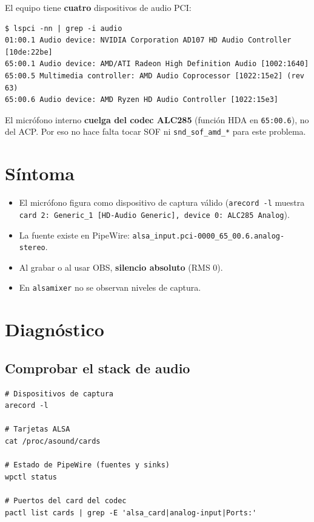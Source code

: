 \documentclass[12pt,a4paper]{article}
\begin{document}
El equipo tiene \textbf{cuatro} dispositivos de audio PCI:

\begin{lstlisting}[style=bash]
$ lspci -nn | grep -i audio
01:00.1 Audio device: NVIDIA Corporation AD107 HD Audio Controller [10de:22be]
65:00.1 Audio device: AMD/ATI Radeon High Definition Audio [1002:1640]
65:00.5 Multimedia controller: AMD Audio Coprocessor [1022:15e2] (rev 63)
65:00.6 Audio device: AMD Ryzen HD Audio Controller [1022:15e3]
\end{lstlisting}

El micrófono interno \textbf{cuelga del codec ALC285} (función HDA en
\texttt{65:00.6}), no del ACP. Por eso no hace falta tocar SOF ni
\texttt{snd\_sof\_amd\_*} para este problema.

\section{Síntoma}

\begin{itemize}
  \item El micrófono figura como dispositivo de captura válido
        (\texttt{arecord -l} muestra \texttt{card 2: Generic\_1 [HD-Audio
        Generic], device 0: ALC285 Analog}).
  \item La fuente existe en PipeWire:
        \texttt{alsa\_input.pci-0000\_65\_00.6.analog-stereo}.
  \item Al grabar o al usar OBS, \textbf{silencio absoluto} (RMS 0).
  \item En \texttt{alsamixer} no se observan niveles de captura.
\end{itemize}

\section{Diagnóstico}

\subsection{Comprobar el stack de audio}

\begin{lstlisting}[style=bash]
# Dispositivos de captura
arecord -l

# Tarjetas ALSA
cat /proc/asound/cards

# Estado de PipeWire (fuentes y sinks)
wpctl status

# Puertos del card del codec
pactl list cards | grep -E 'alsa_card|analog-input|Ports:'
\end{lstlisting}
\end{document}
